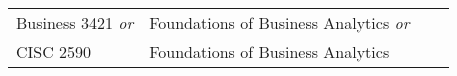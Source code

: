 \documentclass{article}
\begin{document}
\begin{Form}
\begin{longtable}{ |p{2.8cm}|p{6cm}|p{4.8cm}|p{2.3cm}|  }
						Business 3421 \emph{or} & Foundations of Business Analytics \emph{or} &   \TextField[name=3421_instructor,width=4.8cm,charsize=8pt,bordercolor=1 1 1,borderstyle=U]{} &   \TextField[name=3421_grade,width=2.2cm,charsize=8pt,bordercolor=1 1 1]{{}}    \\
						
						CISC 2590 & Foundations of Business Analytics &   \TextField[name=2590_instructor,width=4.8cm,charsize=8pt,bordercolor=1 1 1,borderstyle=U]{} &   \TextField[name=2590_grade,width=2.2cm,charsize=8pt,bordercolor=1 1 1]{{}}    \\
						\hline
						
					\end{longtable}
							\vfill
							
							
						\end{Form}
					
\end{document}
